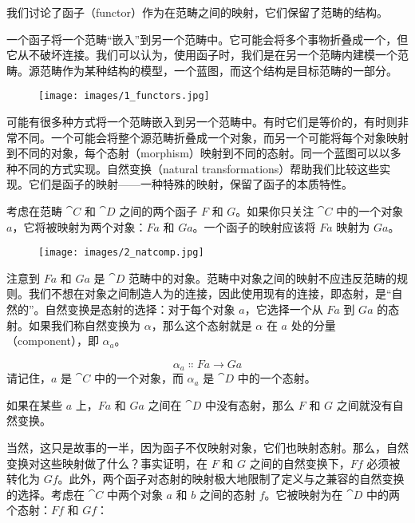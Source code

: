 
\lettrine[lhang=0.17]{我}{们讨论了}函子（functor）作为在范畴之间的映射，它们保留了范畴的结构。

一个函子将一个范畴“嵌入”到另一个范畴中。它可能会将多个事物折叠成一个，但它从不破坏连接。我们可以认为，使用函子时，我们是在另一个范畴内建模一个范畴。源范畴作为某种结构的模型，一个蓝图，而这个结构是目标范畴的一部分。

\begin{figure}[H]
  \centering\texttt{[image: images/1\_functors.jpg]}
\end{figure}

\noindent
可能有很多种方式将一个范畴嵌入到另一个范畴中。有时它们是等价的，有时则非常不同。一个可能会将整个源范畴折叠成一个对象，而另一个可能将每个对象映射到不同的对象，每个态射（morphism）映射到不同的态射。同一个蓝图可以以多种不同的方式实现。自然变换（natural transformations）帮助我们比较这些实现。它们是函子的映射——一种特殊的映射，保留了函子的本质特性。

考虑在范畴 $\cat{C}$ 和 $\cat{D}$ 之间的两个函子 $F$ 和 $G$。如果你只关注 $\cat{C}$ 中的一个对象 $a$，它将被映射为两个对象：$F a$ 和 $G a$。一个函子的映射应该将 $F a$ 映射为 $G a$。

\begin{figure}[H]
  \centering
  \texttt{[image: images/2\_natcomp.jpg]}
\end{figure}

\noindent
注意到 $F a$ 和 $G a$ 是 $\cat{D}$ 范畴中的对象。范畴中对象之间的映射不应违反范畴的规则。我们不想在对象之间制造人为的连接，因此使用现有的连接，即态射，是“自然的”。自然变换是态射的选择：对于每个对象 $a$，它选择一个从 $F a$ 到 $G a$ 的态射。如果我们称自然变换为 $\alpha$，那么这个态射就是 $\alpha$ 在 $a$ 处的分量（component），即 $\alpha_a$。

\[\alpha_a \Colon F a \to G a\]
请记住，$a$ 是 $\cat{C}$ 中的一个对象，而 $\alpha_a$ 是 $\cat{D}$ 中的一个态射。

如果在某些 $a$ 上，$F a$ 和 $G a$ 之间在 $\cat{D}$ 中没有态射，那么 $F$ 和 $G$ 之间就没有自然变换。

当然，这只是故事的一半，因为函子不仅映射对象，它们也映射态射。那么，自然变换对这些映射做了什么？事实证明，在 $F$ 和 $G$ 之间的自然变换下，$F f$ 必须被转化为 $G f$。此外，两个函子对态射的映射极大地限制了定义与之兼容的自然变换的选择。考虑在 $\cat{C}$ 中两个对象 $a$ 和 $b$ 之间的态射 $f$。它被映射为在 $\cat{D}$ 中的两个态射：$F f$ 和 $G f$：

